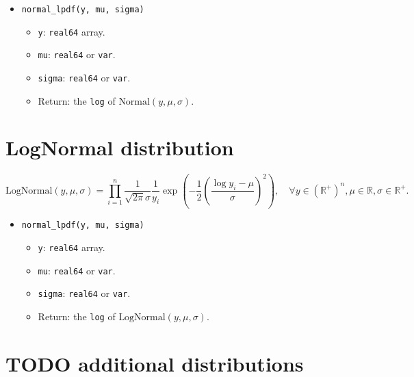 \documentclass[12pt, reqno, oneside]{amsbook}
\numberwithin{equation}{chapter}
\begin{document}
\begin{itemize}
\item \texttt{normal\_lpdf(y, mu, sigma)}
\begin{itemize}
\item \texttt{y}: \texttt{real64} array.
\item \texttt{mu}: \texttt{real64} or \texttt{var}.
\item \texttt{sigma}: \texttt{real64} or \texttt{var}.
\item Return: the \texttt{log} of \(\text{Normal}(y, \mu, \sigma)\).
\end{itemize}
\end{itemize}

\section{LogNormal distribution}
\label{sec:org42eb763}
\begin{equation}
\text{LogNormal}(y, \mu, \sigma) = \prod_{i=1}^n\frac{1}{\sqrt{2\pi}\sigma}\frac{1}{y_i}\exp{
  \left(
    -\frac{1}{2}
    \left(
      \frac{\log{y_i}-\mu}{\sigma}
    \right)^2
  \right)
},\quad
\forall y\in (\mathbb{R}^+)^n, \mu\in \mathbb{R}, \sigma\in \mathbb{R}^+.
\end{equation}

\begin{itemize}
\item \texttt{normal\_lpdf(y, mu, sigma)}
\begin{itemize}
\item \texttt{y}: \texttt{real64} array.
\item \texttt{mu}: \texttt{real64} or \texttt{var}.
\item \texttt{sigma}: \texttt{real64} or \texttt{var}.
\item Return: the \texttt{log} of \(\text{LogNormal}(y, \mu, \sigma)\).
\end{itemize}
\end{itemize}
\section{{\bfseries\sffamily TODO} additional distributions}
\label{sec:org5f5d998}




\end{document}
